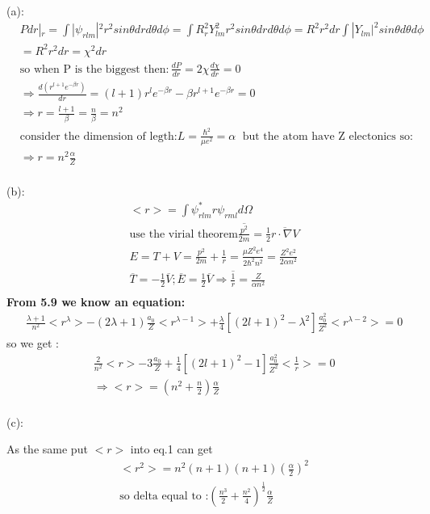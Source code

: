 \documentclass{article}
\begin{document}
(a):
\begin{align*}
  &Pdr|_{r}=\int |\psi_{rlm}|^2r^2sin\theta dr d\theta d\phi=\int R^2_r Y_{lm}^2 r^2sin\theta dr d\theta d\phi=R^2r^2dr\int |Y_{lm}|^2 sin\theta d\theta d\phi \\
  &=R^2r^2dr=\chi^2dr \\
  &\text{so when P is the biggest then}:\frac{dP}{dr}=2\chi\frac{d\chi}{dr}=0\\
  &\Rightarrow \frac{d(r^{l+1}e^{-\beta r})}{dr}=(l+1)r^le^{-\beta r}-\beta r^{l+1}e^{-\beta r} =0 \\
  &\Rightarrow r=\frac{l+1}{\beta}=\frac{n}{\beta}=n^2 \\
  &\text{consider the dimension of legth:}L=\frac{\hbar^2}{\mu e^2}=\alpha\;\text{ but the atom have Z electonics so:} \\
  &\Rightarrow r=n^2\frac{\alpha}{Z}   \\
\end{align*}

(b):
\begin{align*}
&<r>=\int \psi_{rlm}^* r \psi_{rml} d\Omega \\
&\text{use the virial theorem} \overline{\frac{p^2}{2m}}=\frac12\overline{r\cdot \nabla V} \\
&E=T+V=\frac{p^2}{2m}+\frac1{r}=\frac{\mu Z^2e^4}{2\hbar^2 n^2}=\frac{Z^2e^2}{2\alpha n^2} \\
&\overline{T}=-\frac12\overline{V};\overline{E}=\frac12\overline{V}\Rightarrow\overline{\frac1r} =\frac{Z}{\alpha n^2} \\
\end{align*}
\textbf{From 5.9 we know an equation:}
\begin{align*}
&\frac{\lambda+1}{n^2}<r^{\lambda}>-(2\lambda+1)\frac{a_0}{Z}<r^{\lambda-1}>+\frac{\lambda}4[(2l+1)^2-\lambda^2]\frac{a_0^2}{Z^2}<r^{\lambda-2}>=0
  \end{align*}
  so we get :
  \begin{align*}
&\frac2{n^2}<r>-3\frac{a_0}{Z}+\frac14[(2l+1)^2-1]\frac{a_0^2}{Z^2}<\frac1r>=0  \\
&\Rightarrow <r>=(n^2+\frac{n}2)\frac{\alpha}{Z} \\
  \end{align*}

  (c):

  As the same put $<r>$ into eq.1 can get 
  \begin{align*}
&<r^2>=n^2(n+1)(n+1)(\frac{\alpha}2)^2\\
&\text{so delta equal to :}(\frac{n^3}{2}+\frac{n^2}{4})^{\frac12}\frac{\alpha}Z
  \end{align*}
\end{document}
